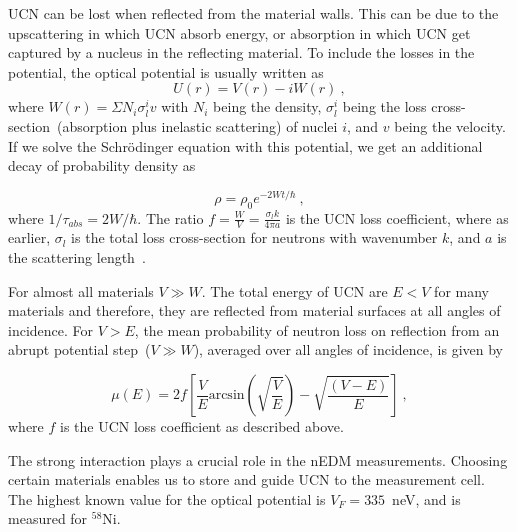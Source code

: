UCN can be lost when reflected from the material walls.  This can be
due to the upscattering in which UCN absorb energy, or absorption in
which UCN get captured by a nucleus in the reflecting material. To
include the losses in the potential, the optical potential is usually
written as
\begin{equation}
  U(r) = V(r) - iW(r)~,
\end{equation}
where $W(r) = \Sigma N_i \sigma^i_l v$ with $N_i$ being the density,
$\sigma^i_l$ being the loss cross-section~(absorption plus inelastic
scattering) of nuclei $i$, and $v$ being the velocity. If we solve the
Schr\"{o}dinger equation with this potential, we get an additional
decay of probability density as

\begin{equation}
\rho = \rho_0 e^{-2Wt/\hbar}~,
\end{equation}
where $1/\tau_{abs} = 2W/\hbar$.  The ratio
$f = \frac{W}{V} = \frac{\sigma_l k}{4 \pi a}$ is the UCN loss
coefficient, where as earlier, $\sigma_l$ is the total loss
cross-section for neutrons with wavenumber $k$, and $a$ is the
scattering length~\cite{ucnbook}.

For almost all materials $V \gg W$. The total energy of UCN are
$E < V$ for many materials and therefore, they are reflected from
material surfaces at all angles of incidence. For $V > E$, the mean
probability of neutron loss on reflection from an abrupt potential
step~($V \gg W$), averaged over all angles of incidence, is given
by~\cite{richardson1991measurement}

\begin{equation}
  \mu(E) = 2f \left[ \frac{V}{E} \mathrm{arcsin} \left( \sqrt{\frac{V}{E}} \right) - \sqrt{\frac{\left( V - E\right)}{E}} \right]~,
\end{equation}
where $f$ is the UCN loss coefficient as described above.


The strong interaction plays a crucial role in the nEDM
measurements. Choosing certain materials enables us to store and guide
UCN to the measurement cell. The highest known value for the optical
potential is $V_F=335$~neV, and is measured for $^{58}$Ni.





